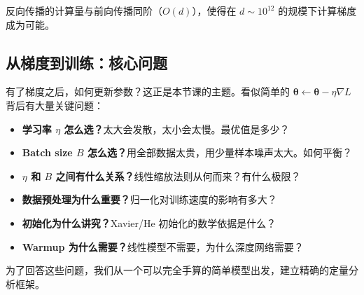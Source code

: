 \documentclass[12pt, a4paper]{ctexart}
\begin{document}
反向传播的计算量与前向传播同阶（$O(d)$），使得在 $d \sim 10^{12}$ 的规模下计算梯度成为可能。

\subsection{从梯度到训练：核心问题}

有了梯度之后，如何更新参数？这正是本节课的主题。看似简单的 $\bm{\theta} \gets \bm{\theta} - \eta \nabla L$ 背后有大量关键问题：

\begin{itemize}
    \item \textbf{学习率 $\eta$ 怎么选？}太大会发散，太小会太慢。最优值是多少？
    \item \textbf{Batch size $B$ 怎么选？}用全部数据太贵，用少量样本噪声太大。如何平衡？
    \item \textbf{$\eta$ 和 $B$ 之间有什么关系？}线性缩放法则从何而来？有什么极限？
    \item \textbf{数据预处理为什么重要？}归一化对训练速度的影响有多大？
    \item \textbf{初始化为什么讲究？}Xavier/He 初始化的数学依据是什么？
    \item \textbf{Warmup 为什么需要？}线性模型不需要，为什么深度网络需要？
\end{itemize}

为了回答这些问题，我们从一个可以完全手算的简单模型出发，建立精确的定量分析框架。
\end{document}
